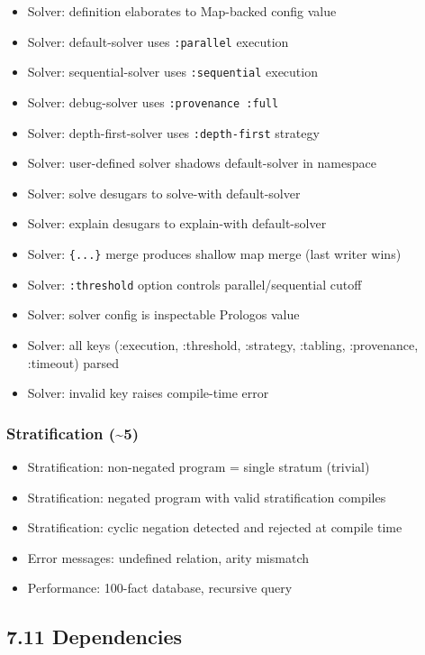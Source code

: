 \documentclass[11pt]{article}
\begin{document}
\begin{itemize}
\item Solver: definition elaborates to Map-backed config value
\item Solver: default-solver uses \texttt{:parallel} execution
\item Solver: sequential-solver uses \texttt{:sequential} execution
\item Solver: debug-solver uses \texttt{:provenance :full}
\item Solver: depth-first-solver uses \texttt{:depth-first} strategy
\item Solver: user-defined solver shadows default-solver in namespace
\item Solver: solve desugars to solve-with default-solver
\item Solver: explain desugars to explain-with default-solver
\item Solver: \texttt{\{...\}} merge produces shallow map merge (last writer wins)
\item Solver: \texttt{:threshold} option controls parallel/sequential cutoff
\item Solver: solver config is inspectable Prologos value
\item Solver: all keys (:execution, :threshold, :strategy, :tabling, :provenance, :timeout) parsed
\item Solver: invalid key raises compile-time error
\end{itemize}
\subsubsection{Stratification (\textasciitilde{}5)}
\label{sec:org530cc87}

\begin{itemize}
\item Stratification: non-negated program = single stratum (trivial)
\item Stratification: negated program with valid stratification compiles
\item Stratification: cyclic negation detected and rejected at compile time
\item Error messages: undefined relation, arity mismatch
\item Performance: 100-fact database, recursive query
\end{itemize}
\subsection{7.11 Dependencies}
\label{sec:orge79c706}
\end{document}

